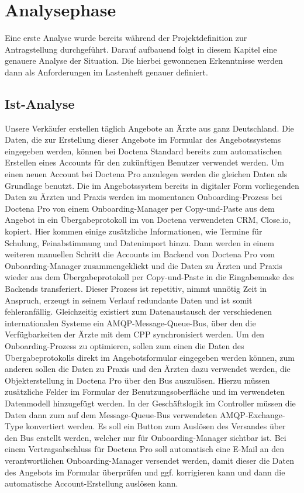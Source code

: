 \section{Analysephase} 
\label{sec:Analysephase}
Eine erste Analyse wurde bereits während der Projektdefinition zur Antragstellung durchgeführt. Darauf aufbauend folgt in diesem Kapitel eine genauere Analyse der Situation. Die hierbei gewonnenen Erkenntnisse werden dann als Anforderungen im Lastenheft genauer definiert.

\subsection{Ist-Analyse} 
\label{sec:IstAnalyse}
Unsere Verkäufer erstellen täglich Angebote an Ärzte aus ganz Deutschland. Die Daten, die zur Erstellung dieser Angebote im Formular des Angebotssystems eingegeben werden, können bei Doctena Standard bereits zum automatischen Erstellen eines Accounts für den zukünftigen Benutzer verwendet werden.
Um einen neuen Account bei Doctena Pro anzulegen werden die gleichen Daten als Grundlage benutzt. Die im Angebotssystem bereits in digitaler Form vorliegenden Daten zu Ärzten und Praxis werden im momentanen Onboarding-Prozess bei Doctena Pro von einem Onboarding-Manager per Copy-und-Paste aus dem Angebot in ein Übergabeprotokoll im von Doctena verwendeten CRM, Close.io, kopiert. Hier kommen einige zusätzliche Informationen, wie Termine für Schulung, Feinabstimmung und Datenimport hinzu. Dann werden in einem weiteren manuellen Schritt die Accounts im Backend von Doctena Pro vom Onboarding-Manager zusammengeklickt und die Daten zu Ärzten und Praxis wieder aus dem Übergabeprotokoll per Copy-und-Paste in die Eingabemaske des Backends transferiert. Dieser Prozess ist repetitiv, nimmt unnötig Zeit in Anspruch, erzeugt in seinem Verlauf redundante Daten und ist somit fehleranfällig.
Gleichzeitig existiert zum Datenaustausch der verschiedenen internationalen Systeme ein AMQP-Message-Queue-Bus, über den die Verfügbarkeiten der Ärzte mit dem CPP synchronisiert werden.
Um den Onboarding-Prozess zu optimieren, sollen zum einen die Daten des Übergabeprotokolls direkt im Angebotsformular eingegeben werden können, zum anderen sollen die Daten zu Praxis und den Ärzten dazu verwendet werden, die Objekterstellung in Doctena Pro über den Bus auszulösen. Hierzu müssen zusätzliche Felder im Formular der Benutzungsoberfläche und im verwendeten Datenmodell hinzugefügt werden. In der Geschäftslogik im Controller müssen die Daten dann zum auf dem Message-Queue-Bus verwendeten AMQP-Exchange-Type konvertiert werden. Es soll ein Button zum Auslösen des Versandes über den Bus erstellt werden, welcher nur für Onboarding-Manager sichtbar ist. Bei einem Vertragsabschluss für Doctena Pro soll automatisch eine E-Mail an den verantwortlichen Onboarding-Manager versendet werden, damit dieser die Daten des Angebots im Formular überprüfen und ggf. korrigieren kann und dann die automatische Account-Erstellung auslösen kann.

